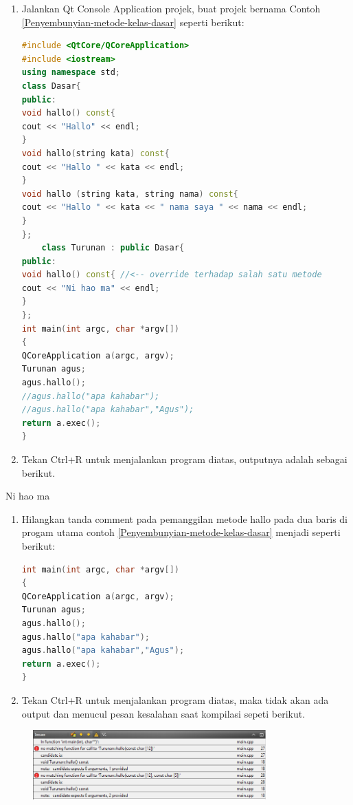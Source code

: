 \begin{enumerate}
\def\labelenumi{\arabic{enumi}.}
\item
  Jalankan Qt Console Application projek, buat projek bernama Contoh \ref{Penyembunyian-metode-kelas-dasar}
  seperti berikut:

\begin{lstlisting}[language=c++, caption=Penyembunyian metode kelas dasar, label=Penyembunyian-metode-kelas-dasar]
#include <QtCore/QCoreApplication>
#include <iostream>
using namespace std;
class Dasar{
public:
void hallo() const{
cout << "Hallo" << endl;
}
void hallo(string kata) const{
cout << "Hallo " << kata << endl;
}
void hallo (string kata, string nama) const{
cout << "Hallo " << kata << " nama saya " << nama << endl;
}
};
    class Turunan : public Dasar{
public:
void hallo() const{ //<-- override terhadap salah satu metode
cout << "Ni hao ma" << endl;
}
};
int main(int argc, char *argv[])
{
QCoreApplication a(argc, argv);
Turunan agus;
agus.hallo();
//agus.hallo("apa kahabar");
//agus.hallo("apa kahabar","Agus");
return a.exec();
}
\end{lstlisting}
\item
  Tekan Ctrl+R untuk menjalankan program diatas, outputnya adalah
  sebagai berikut.
\end{enumerate}

\begin{lcverbatim}
 Ni hao ma
\end{lcverbatim}

\begin{enumerate}
\def\labelenumi{\arabic{enumi}.}
\setcounter{enumi}{2}
\item
  Hilangkan tanda comment pada pemanggilan metode hallo pada dua baris
  di progam utama contoh \ref{Penyembunyian-metode-kelas-dasar} menjadi seperti berikut:

\begin{lstlisting}[language=c++, caption=Menghilangkan comment pada metode hallo]
int main(int argc, char *argv[])
{
QCoreApplication a(argc, argv);
Turunan agus;
agus.hallo();
agus.hallo("apa kahabar");
agus.hallo("apa kahabar","Agus");
return a.exec();
}
\end{lstlisting}
\item
  Tekan Ctrl+R untuk menjalankan program diatas, maka tidak akan ada
  output dan menucul pesan kesalahan saat kompilasi sepeti berikut.
\end{enumerate}

\begin{figure}[htbp]
\centering
\includegraphics[width=0.8\textwidth]{images/capture7-5.png}

\end{figure}

